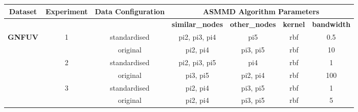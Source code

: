 \documentclass{mpaper}
\begin{document}
\begin{table}[]
\centering
\begin{tabular}{|ccc|cccc|}
\hline
\multicolumn{1}{|c|}{\textbf{Dataset}}                & \multicolumn{1}{c|}{\textbf{Experiment}} & \textbf{Data Configuration} & \multicolumn{4}{c|}{\textbf{ASMMD Algorithm Parameters}}                                                                                              \\ \hline
\multicolumn{1}{|l}{}                                 & \textbf{}                                & \textbf{}          & \multicolumn{1}{c|}{\textbf{similar\_nodes}} & \multicolumn{1}{c|}{\textbf{other\_nodes}} & \multicolumn{1}{c|}{\textbf{kernel}} & \textbf{bandwidth} \\ \hline
\multicolumn{1}{|c|}{\multirow{6}{*}{\textbf{GNFUV}}} & \multicolumn{1}{c|}{\multirow{2}{*}{1}}  & standardised       & \multicolumn{1}{c|}{pi2, pi3, pi4}           & \multicolumn{1}{c|}{pi5}                   & \multicolumn{1}{c|}{rbf}             & 0.5                \\
\multicolumn{1}{|c|}{}                                & \multicolumn{1}{c|}{}                    & original           & \multicolumn{1}{c|}{pi2, pi4}                & \multicolumn{1}{c|}{pi3, pi5}              & \multicolumn{1}{c|}{rbf}             & 10                 \\ \cline{2-7} 
\multicolumn{1}{|c|}{}                                & \multicolumn{1}{c|}{\multirow{2}{*}{2}}  & standardised       & \multicolumn{1}{c|}{pi2, pi3, pi5}           & \multicolumn{1}{c|}{pi4}                   & \multicolumn{1}{c|}{rbf}             & 1                  \\
\multicolumn{1}{|c|}{}                                & \multicolumn{1}{c|}{}                    & original           & \multicolumn{1}{c|}{pi3, pi5}                & \multicolumn{1}{c|}{pi2, pi4}              & \multicolumn{1}{c|}{rbf}             & 100                \\ \cline{2-7} 
\multicolumn{1}{|c|}{}                                & \multicolumn{1}{c|}{\multirow{2}{*}{3}}  & standardised       & \multicolumn{1}{c|}{pi2, pi4}                & \multicolumn{1}{c|}{pi3, pi5}              & \multicolumn{1}{c|}{rbf}             & 1                  \\
\multicolumn{1}{|c|}{}                                & \multicolumn{1}{c|}{}                    & original           & \multicolumn{1}{c|}{pi2, pi4}                & \multicolumn{1}{c|}{pi3, pi5}              & \multicolumn{1}{c|}{rbf}             & 5                  \\ \hline

\end{tabular}
\end{table}
\end{document}
